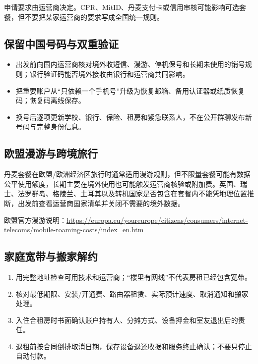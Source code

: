 申请要求由运营商决定。CPR、MitID、丹麦支付卡或信用审核可能影响可选套餐，但不要把某家运营商的要求写成全国统一规则。

\subsection{保留中国号码与双重验证}

\begin{itemize}[leftmargin=2em,itemsep=3pt]
  \item 出发前向国内运营商核对境外收短信、漫游、停机保号和长期未使用的销号规则；银行验证码能否境外接收由银行和运营商共同影响。
  \item 把重要账户从“只依赖一个手机号”升级为恢复邮箱、备用认证器或纸质恢复码；恢复码离线保存。
  \item 换号后逐项更新学校、银行、保险、租房和紧急联系人，不在公开群聊发布新号码与完整身份信息。
\end{itemize}

\subsection{欧盟漫游与跨境旅行}

丹麦套餐在欧盟/欧洲经济区旅行时通常适用漫游规则，但不限量套餐可能有数据公平使用额度，长期主要在境外使用也可能触发运营商核验或附加费。英国、瑞士、法罗群岛、格陵兰、土耳其以及转机国家是否包含在套餐内不能凭地理位置推断，出发前查看运营商国家清单并关闭不需要的境外数据。

欧盟官方漫游说明：\url{https://europa.eu/youreurope/citizens/consumers/internet-telecoms/mobile-roaming-costs/index_en.htm}

\subsection{家庭宽带与搬家解约}

\begin{enumerate}[leftmargin=2.2em,itemsep=3pt]
  \item 用完整地址检查可用技术和运营商；“楼里有网线”不代表房租已经包含宽带。
  \item 核对最低期限、安装/开通费、路由器租赁、实际预计速度、取消通知和搬家处理。
  \item 入住合租房时书面确认账户持有人、分摊方式、设备押金和室友退出后的责任。
  \item 退租前按合同倒排取消日期，保存设备退还收据和服务终止确认；不要只停止自动付款。
\end{enumerate}


